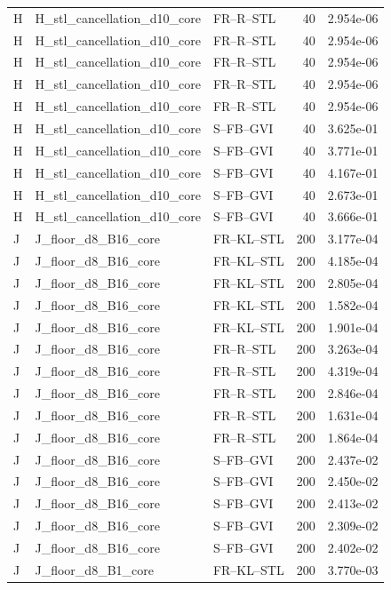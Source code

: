 \begin{tabular}{lllrr}
H & H_stl_cancellation_d10_core & FR--R--STL & 40 & 2.954e-06 \\
H & H_stl_cancellation_d10_core & FR--R--STL & 40 & 2.954e-06 \\
H & H_stl_cancellation_d10_core & FR--R--STL & 40 & 2.954e-06 \\
H & H_stl_cancellation_d10_core & FR--R--STL & 40 & 2.954e-06 \\
H & H_stl_cancellation_d10_core & FR--R--STL & 40 & 2.954e-06 \\
H & H_stl_cancellation_d10_core & S--FB--GVI & 40 & 3.625e-01 \\
H & H_stl_cancellation_d10_core & S--FB--GVI & 40 & 3.771e-01 \\
H & H_stl_cancellation_d10_core & S--FB--GVI & 40 & 4.167e-01 \\
H & H_stl_cancellation_d10_core & S--FB--GVI & 40 & 2.673e-01 \\
H & H_stl_cancellation_d10_core & S--FB--GVI & 40 & 3.666e-01 \\
J & J_floor_d8_B16_core & FR--KL--STL & 200 & 3.177e-04 \\
J & J_floor_d8_B16_core & FR--KL--STL & 200 & 4.185e-04 \\
J & J_floor_d8_B16_core & FR--KL--STL & 200 & 2.805e-04 \\
J & J_floor_d8_B16_core & FR--KL--STL & 200 & 1.582e-04 \\
J & J_floor_d8_B16_core & FR--KL--STL & 200 & 1.901e-04 \\
J & J_floor_d8_B16_core & FR--R--STL & 200 & 3.263e-04 \\
J & J_floor_d8_B16_core & FR--R--STL & 200 & 4.319e-04 \\
J & J_floor_d8_B16_core & FR--R--STL & 200 & 2.846e-04 \\
J & J_floor_d8_B16_core & FR--R--STL & 200 & 1.631e-04 \\
J & J_floor_d8_B16_core & FR--R--STL & 200 & 1.864e-04 \\
J & J_floor_d8_B16_core & S--FB--GVI & 200 & 2.437e-02 \\
J & J_floor_d8_B16_core & S--FB--GVI & 200 & 2.450e-02 \\
J & J_floor_d8_B16_core & S--FB--GVI & 200 & 2.413e-02 \\
J & J_floor_d8_B16_core & S--FB--GVI & 200 & 2.309e-02 \\
J & J_floor_d8_B16_core & S--FB--GVI & 200 & 2.402e-02 \\
J & J_floor_d8_B1_core & FR--KL--STL & 200 & 3.770e-03 \\

\end{tabular}
